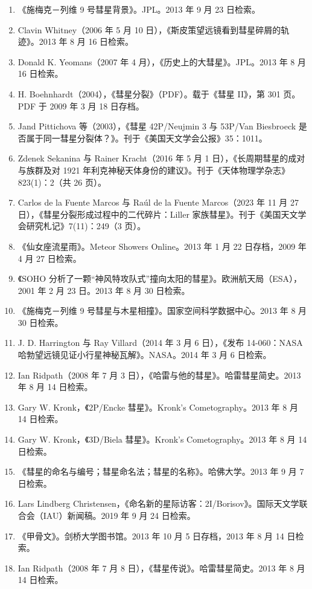 \begin{enumerate}
\item 《施梅克－列维 9 号彗星背景》。JPL。2013 年 9 月 23 日检索。
\item Clavin Whitney（2006 年 5 月 10 日），《斯皮策望远镜看到彗星碎屑的轨迹》。2013 年 8 月 16 日检索。
\item Donald K. Yeomans（2007 年 4 月），《历史上的大彗星》。JPL。2013 年 8 月 16 日检索。
\item H. Boehnhardt（2004），《彗星分裂》（PDF）。载于《彗星 II》，第 301 页。PDF 于 2009 年 3 月 18 日存档。
\item Jand Pittichova 等（2003），《彗星 42P/Neujmin 3 与 53P/Van Biesbroeck 是否属于同一彗星分裂体？》。刊于《美国天文学会公报》35：1011。
\item Zdenek Sekanina 与 Rainer Kracht（2016 年 5 月 1 日），《长周期彗星的成对与族群及对 1921 年利克神秘天体身份的建议》。刊于《天体物理学杂志》823(1)：2（共 26 页）。
\item Carlos de la Fuente Marcos 与 Raúl de la Fuente Marcos（2023 年 11 月 27 日），《彗星分裂形成过程中的二代碎片：Liller 家族彗星》。刊于《美国天文学会研究札记》7(11)：249（3 页）。
\item 《仙女座流星雨》。Meteor Showers Online。2013 年 1 月 22 日存档，2009 年 4 月 27 日检索。
\item 《SOHO 分析了一颗“神风特攻队式”撞向太阳的彗星》。欧洲航天局（ESA），2001 年 2 月 23 日。2013 年 8 月 30 日检索。
\item 《施梅克－列维 9 号彗星与木星相撞》。国家空间科学数据中心。2013 年 8 月 30 日检索。
\item J. D. Harrington 与 Ray Villard（2014 年 3 月 6 日），《发布 14-060：NASA 哈勃望远镜见证小行星神秘瓦解》。NASA。2014 年 3 月 6 日检索。
\item Ian Ridpath（2008 年 7 月 3 日），《哈雷与他的彗星》。哈雷彗星简史。2013 年 8 月 14 日检索。
\item Gary W. Kronk，《2P/Encke 彗星》。Kronk's Cometography。2013 年 8 月 14 日检索。
\item Gary W. Kronk，《3D/Biela 彗星》。Kronk's Cometography。2013 年 8 月 14 日检索。
\item 《彗星的命名与编号；彗星命名法；彗星的名称》。哈佛大学。2013 年 9 月 7 日检索。
\item Lars Lindberg Christensen，《命名新的星际访客：2I/Borisov》。国际天文学联合会（IAU）新闻稿。2019 年 9 月 24 日检索。
\item 《甲骨文》。剑桥大学图书馆。2013 年 10 月 5 日存档，2013 年 8 月 14 日检索。
\item Ian Ridpath（2008 年 7 月 8 日），《彗星传说》。哈雷彗星简史。2013 年 8 月 14 日检索。

\end{enumerate}
